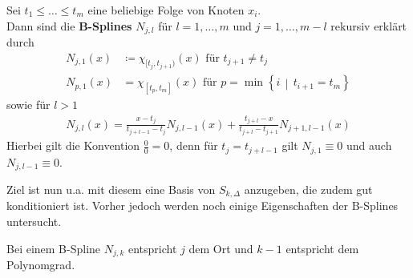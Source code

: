\begin{Defe}
  Sei $t_1\leq \dots \leq t_m$ eine beliebige Folge von Knoten
  $x_i$.\\
  Dann sind die \textbf{B-Splines}
  $N_{j,l}$ für $l=1,\dots, m$ und $j=1,\dots, m-l$ 
  rekursiv erklärt durch
  \begin{align}\nonumber
    N_{j,1}(x) &\coloneqq \chi_{[t_j,t_{j+1})}(x) 
                 \text{ für } t_{j+1}\neq t_j\\
    N_{p,1}(x) &= \chi_{[t_p,t_m]}(x) 
                 \text{ für }
                 p=\min\left\{i\,\middle\vert\,t_{i+1}=t_m\right\}
                 \label{VI.2.3}
  \end{align}
  sowie für $l>1$
  \begin{gather}
    N_{j,l} (x) = \frac{x-t_j}{t_{j+l-1}-t_j}N_{j,l-1}(x) 
    +  \frac{t_{j+l}-x}{t_{j+l}-t_{j+1}}N_{j+1,l-1}(x) 
    \label{VI.2.4}
  \end{gather}
  Hierbei gilt die Konvention $\frac{0}{0}=0$, 
  denn für $t_j=t_{j+l-1}$ gilt
  $N_{j,1}\equiv 0$ und auch $N_{j,l-1}\equiv 0$.
\end{Defe}


Ziel ist nun u.a. mit diesem eine Basis von $S_{k,\Delta}$ anzugeben,
die zudem gut konditioniert ist.
Vorher jedoch werden noch einige Eigenschaften der B-Splines
untersucht.


\label{6.2.6}
Bei einem B-Spline $N_{j,k}$ entspricht $j$ dem Ort und
$k-1$ entspricht dem Polynomgrad.

